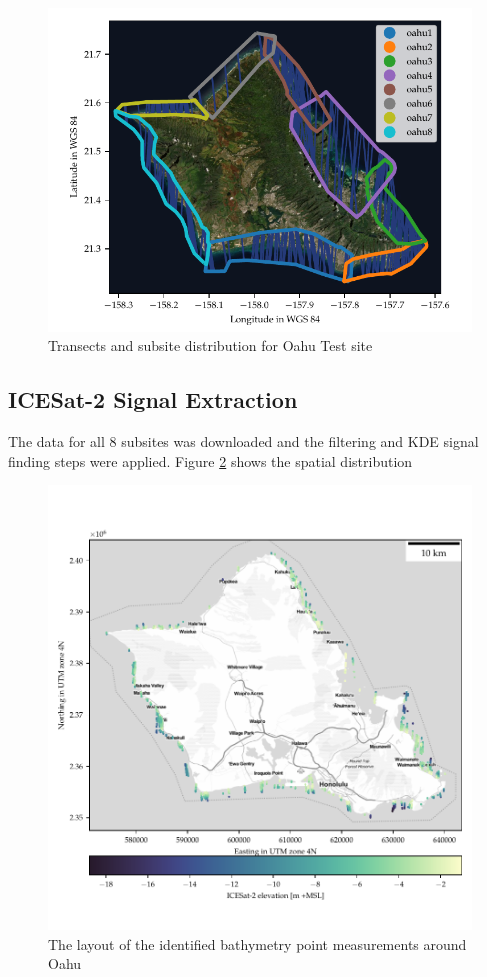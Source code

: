 \begin{figure}[h]
    \centering
    \includegraphics[width=\textwidth]{figures/Oahu_all_tracklines.pdf}
    \caption{Transects and subsite distribution for Oahu Test site}
    \label{fig:oahu-all-sites-transects}
\end{figure}

\subsection{ICESat-2 Signal Extraction}

The data for all 8 subsites was downloaded and the filtering and KDE signal finding steps were applied. Figure \ref{fig:oahu-all-photon-map} shows the spatial distribution

\begin{figure}[h]
    \centering
    \includegraphics[width=\textwidth]{figures/Oahu_all_sites_photon_points.pdf}
    \caption{The layout of the identified bathymetry point measurements around Oahu}
    \label{fig:oahu-all-photon-map}
\end{figure}

